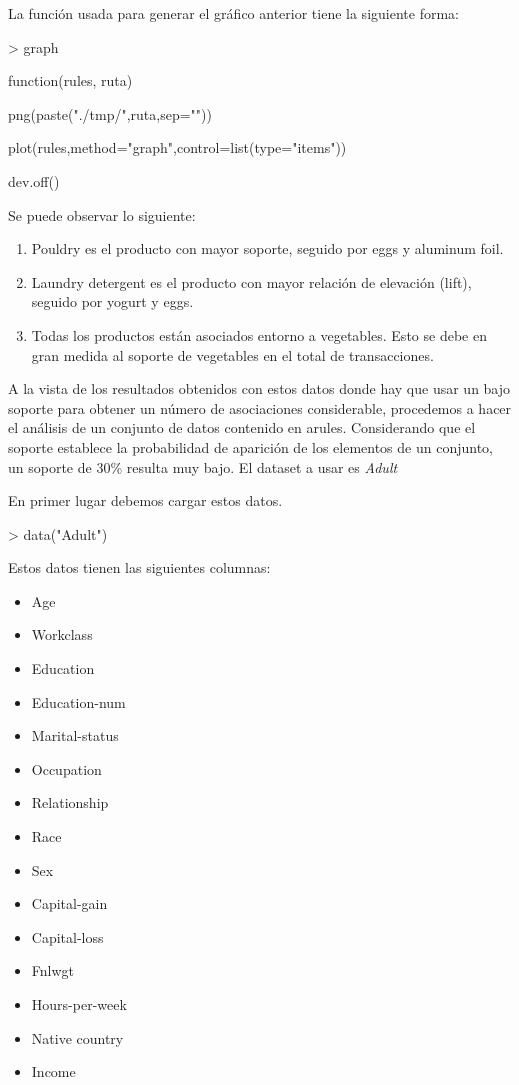 \documentclass [a4paper] {article}
\begin{document}
{\bigskip
La función usada para generar el gráfico anterior tiene la siguiente forma:
\begin{Schunk}
\begin{Sinput}
> graph
\end{Sinput}
\begin{Soutput}
function(rules, ruta) {

    png(paste("./tmp/",ruta,sep=""))

    plot(rules,method="graph",control=list(type="items"))

    dev.off()
}
\end{Soutput}
\end{Schunk}

\bigskip
Se puede observar lo siguiente: 
\begin{enumerate}
\item Pouldry es el producto con mayor soporte, seguido por eggs y aluminum foil.
\item Laundry detergent es el producto con mayor relación de elevación (lift), seguido por yogurt y eggs.
\item Todas los productos están asociados entorno a vegetables. Esto se debe en gran medida al soporte de vegetables
en el total de transacciones.
\end{enumerate}


\bigskip
A la vista de los resultados obtenidos con estos datos donde hay que usar un bajo soporte para obtener un
número de asociaciones considerable, procedemos a hacer el análisis de un conjunto de datos contenido en arules. Considerando que el
soporte establece la probabilidad de aparición de los elementos de un conjunto, un soporte de 30\% resulta muy bajo.
El dataset a usar es \textit{Adult}

\bigskip
En primer lugar debemos cargar estos datos.
\begin{Schunk}
\begin{Sinput}
> data("Adult")
\end{Sinput}
\end{Schunk}

\bigskip
Estos datos tienen las siguientes columnas:
\begin{itemize}
\item Age
\item Workclass
\item Education
\item Education-num
\item Marital-status
\item Occupation
\item Relationship
\item Race
\item Sex
\item Capital-gain
\item Capital-loss
\item Fnlwgt
\item Hours-per-week
\item Native country
\item Income
\end{itemize}

}
\end{document}
